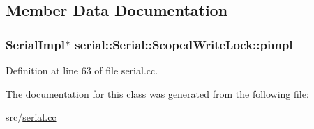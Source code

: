 \subsection{Member Data Documentation}
\subsubsection[{\texorpdfstring{pimpl\+\_\+}{pimpl_}}]{\setlength{\rightskip}{0pt plus 5cm}Serial\+Impl$\ast$ serial\+::\+Serial\+::\+Scoped\+Write\+Lock\+::pimpl\+\_\+\hspace{0.3cm}{\ttfamily [private]}}\hypertarget{class_serial_1_1_scoped_write_lock_aa7d7430d81f824316afdc2338685ec34}{}\label{class_serial_1_1_scoped_write_lock_aa7d7430d81f824316afdc2338685ec34}


Definition at line 63 of file serial.\+cc.



The documentation for this class was generated from the following file\+:\begin{DoxyCompactItemize}
\item 
src/\hyperlink{serial_8cc}{serial.\+cc}\end{DoxyCompactItemize}
